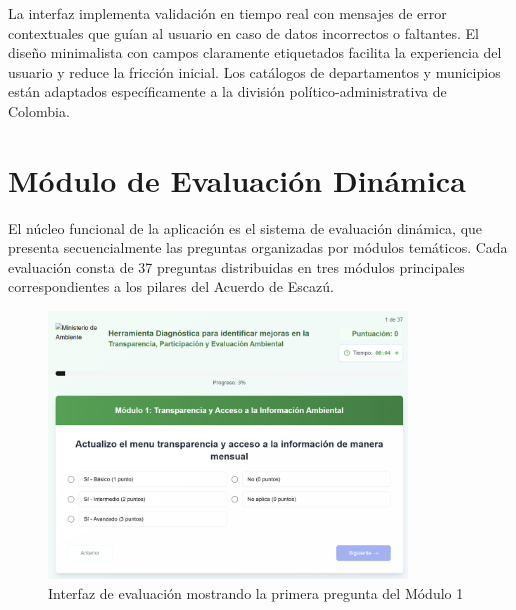 \documentclass[12pt,a4paper]{report}
\begin{document}
La interfaz implementa validación en tiempo real con mensajes de error contextuales que guían al usuario en caso de datos incorrectos o faltantes. El diseño minimalista con campos claramente etiquetados facilita la experiencia del usuario y reduce la fricción inicial. Los catálogos de departamentos y municipios están adaptados específicamente a la división político-administrativa de Colombia.

\section{Módulo de Evaluación Dinámica}
El núcleo funcional de la aplicación es el sistema de evaluación dinámica, que presenta secuencialmente las preguntas organizadas por módulos temáticos. Cada evaluación consta de 37 preguntas distribuidas en tres módulos principales correspondientes a los pilares del Acuerdo de Escazú.

\begin{figure}[h]
    \centering
    \includegraphics[width=0.85\textwidth]{Captura de pantalla 2025-06-26 121706.png}
    \caption{Interfaz de evaluación mostrando la primera pregunta del Módulo 1}
\end{figure}
\end{document}
